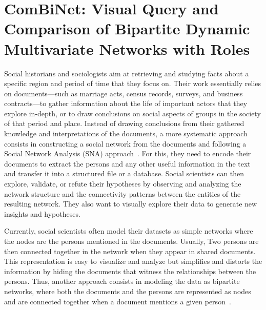 \chapter{ComBiNet: Visual Query and Comparison of Bipartite Dynamic Multivariate Networks with Roles}




Social historians and sociologists aim at retrieving and studying facts about a specific region and period of time that they focus on. Their work essentially relies on documents---such as marriage acts, census records, surveys, and business contracts---to gather information about the life of important actors that they explore in-depth, or to draw conclusions on social aspects of groups in the society of that period and place. Instead of drawing conclusions from their gathered knowledge and interpretations of the documents, a more systematic approach consists in constructing a social network from the documents and following a Social Network Analysis (SNA) approach~\cite{wetherellHistoricalSocialNetwork1998}. For this, they need to encode their documents to extract the persons and any other useful information in the text and transfer it into a structured file or a database. Social scientists can then explore, validate, or refute their hypotheses by observing and analyzing the network structure and the connectivity patterns between the entities of the resulting network. They also want to visually explore their data to generate new insights and hypotheses.

Currently, social scientists often model their datasets as simple networks where the nodes are the persons mentioned in the documents. Usually, Two persons are then connected together in the network when they appear in shared documents.
This representation is easy to visualize and analyze but simplifies and distorts the information by hiding the documents that witness the relationships between the persons.
Thus, another approach consists in modeling the data as bipartite networks, where both the documents and the persons are represented as nodes and are connected together when a document mentions a given person~\cite{grandjeanAnalisiVisualizzazioniReti2017, rossiExplorationLargeDatabase2014, shafieHypergraphRepresentationsStudy2017}.

